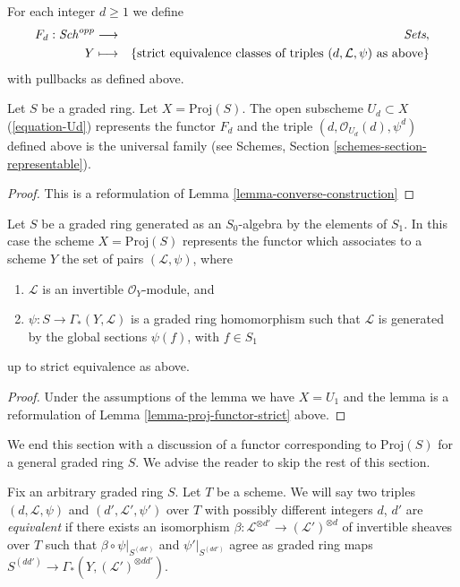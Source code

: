 \medskip\noindent
For each integer $d \geq 1$ we define
\begin{eqnarray*}
F_d : \mathit{Sch}^{opp} & \longrightarrow & \textit{Sets}, \\
Y & \longmapsto &
\{\text{strict equivalence classes of triples }
(d, \mathcal{L}, \psi)
\text{ as above}\}
\end{eqnarray*}
with pullbacks as defined above.

\begin{lemma}
\label{lemma-proj-functor-strict}
Let $S$ be a graded ring.
Let $X = \text{Proj}(S)$.
The open subscheme $U_d \subset X$ (\ref{equation-Ud}) represents the
functor $F_d$ and the triple $(d, \mathcal{O}_{U_d}(d), \psi^d)$
defined above is the universal family (see
Schemes, Section \ref{schemes-section-representable}).
\end{lemma}

\begin{proof}
This is a reformulation of Lemma \ref{lemma-converse-construction}
\end{proof}

\begin{lemma}
\label{lemma-apply}
Let $S$ be a graded ring generated as an $S_0$-algebra by
the elements of $S_1$. In this case the scheme $X = \text{Proj}(S)$
represents the functor which associates to a scheme
$Y$ the set of pairs $(\mathcal{L}, \psi)$, where
\begin{enumerate}
\item $\mathcal{L}$ is an invertible $\mathcal{O}_Y$-module, and
\item $\psi : S \to \Gamma_*(Y, \mathcal{L})$ is a graded
ring homomorphism such that $\mathcal{L}$ is generated by
the global sections $\psi(f)$, with $f \in S_1$
\end{enumerate}
up to strict equivalence as above.
\end{lemma}

\begin{proof}
Under the assumptions of the lemma we have $X = U_1$ and the
lemma is a reformulation of Lemma \ref{lemma-proj-functor-strict} above.
\end{proof}

\noindent
We end this section with a discussion of a functor corresponding
to $\text{Proj}(S)$ for a general graded ring $S$.
We advise the reader to skip the rest of this section.

\medskip\noindent
Fix an arbitrary graded ring $S$. Let $T$ be a scheme.
We will say two triples $(d, \mathcal{L}, \psi)$ and
$(d', \mathcal{L}', \psi')$ over $T$ with possibly different integers
$d$, $d'$ are {\it equivalent} if there exists
an isomorphism
$\beta : \mathcal{L}^{\otimes d'} \to (\mathcal{L}')^{\otimes d}$
of invertible sheaves over $T$
such that $\beta \circ \psi|_{S^{(dd')}}$ and $\psi'|_{S^{(dd')}}$ agree
as graded ring maps $S^{(dd')} \to \Gamma_*(Y, (\mathcal{L}')^{\otimes dd'})$.

